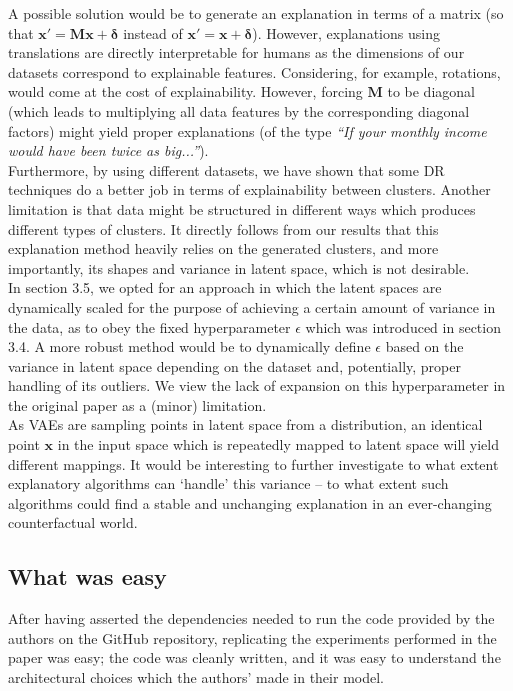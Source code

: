 A possible solution would be to generate an explanation in terms of a matrix (so that $\boldsymbol{x'} = \boldsymbol{Mx} + \boldsymbol{\delta}$ instead of $\boldsymbol{x'} = \boldsymbol{x} + \boldsymbol{\delta}$). However, explanations using translations are directly interpretable for humans as the dimensions of our datasets correspond to explainable features. Considering, for example, rotations, would come at the cost of explainability. However, forcing $\boldsymbol{M}$ to be diagonal (which leads to multiplying all data features by the corresponding diagonal factors) might yield proper explanations (of the type \textit{``If your monthly income would have been twice as big...''}).\\

Furthermore, by using different datasets, we have shown that some DR techniques do a better job in terms of explainability between clusters. Another limitation is that data might be structured in different ways which produces different types of clusters. It directly follows from our results that this explanation method heavily relies on the generated clusters, and more importantly, its shapes and variance in latent space, which is not desirable.\\

In section 3.5, we opted for an approach in which the latent spaces are dynamically scaled for the purpose of achieving a certain amount of variance in the data, as to obey the fixed hyperparameter $\epsilon$ which was introduced in section 3.4. A more robust method would be to dynamically define $\epsilon$ based on the variance in latent space depending on the dataset and, potentially, proper handling of its outliers. We view the lack of expansion on this hyperparameter in the original paper as a (minor) limitation.\\

As VAEs are sampling points in latent space from a distribution, an identical point $\boldsymbol{x}$ in the input space which is repeatedly mapped to latent space will yield different mappings. It would be interesting to further investigate to what extent explanatory algorithms can `handle' this variance -- to what extent such algorithms could find a stable and unchanging explanation in an ever-changing counterfactual world.


\subsection{What was easy}
After having asserted the dependencies needed to run the code provided by the authors on the GitHub repository, replicating the experiments performed in the paper was easy; the code was cleanly written, and it was easy to understand the architectural choices which the authors' made in their model.


